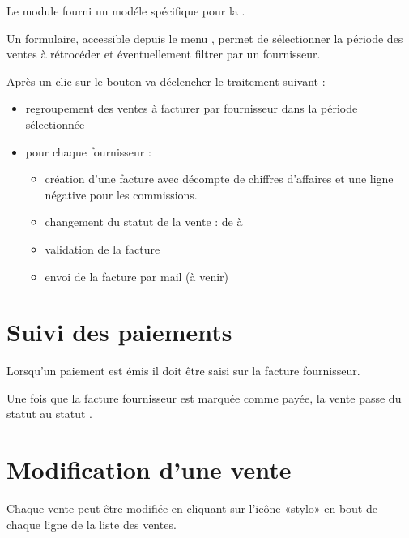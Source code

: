 \documentclass[letterpaper,10pt,english]{sphinxmanual}
\begin{document}
Le module fourni un modéle spécifique pour la .

Un formulaire, accessible depuis le menu , permet de sélectionner la période des ventes à rétrocéder et éventuellement filtrer par un fournisseur.


Après un clic sur le bouton  va déclencher le traitement suivant :
\begin{itemize}
\item {} 
regroupement des ventes à facturer par fournisseur dans la période sélectionnée

\item {} 
pour chaque fournisseur :
\begin{itemize}
\item {} 
création d'une facture avec décompte de chiffres d'affaires et une ligne négative pour les commissions.

\item {} 
changement du statut de la vente : de  à 

\item {} 
validation de la facture

\item {} 
envoi de la facture par mail (à venir)

\end{itemize}

\end{itemize}


\section{Suivi des paiements}
\label{\detokenize{ventes:suivi-des-paiements}}
Lorsqu'un paiement est émis il doit être saisi sur la facture fournisseur.

Une fois que la facture fournisseur est marquée comme payée, la vente passe du statut  au statut .


\section{Modification d'une vente}
\label{\detokenize{ventes:modification-d-une-vente}}
Chaque vente peut être modifiée en cliquant sur l'icône «stylo» en bout de chaque ligne de la liste des ventes.
\end{document}
